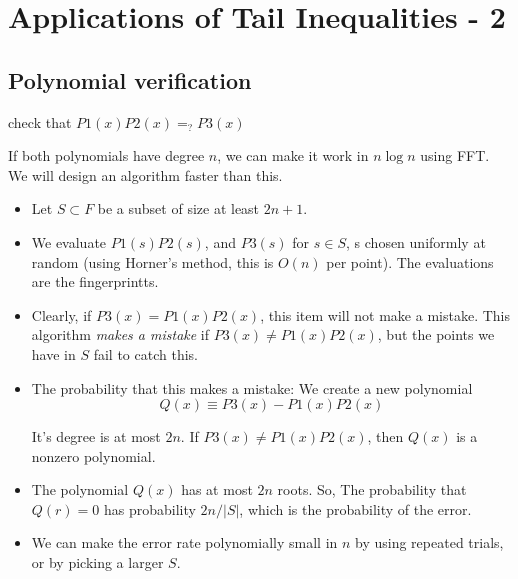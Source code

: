 \chapter{Applications of Tail Inequalities - 2}


\section{Polynomial verification}
check that $P1(x) P2(x) =_? P3(x)$

If both polynomials have degree $n$, we can make it work in $n \log n$ using
FFT. We will design an algorithm faster than this.


\begin{itemize}
    \item Let $S \subset F$ be a subset of size at least $2n + 1$.
    \item We evaluate $P1(s) P2(s)$, and $P3(s)$ for $s \in S$, s chosen uniformly
    at random (using Horner's method, this is $O(n)$ per point). The evaluations
    are the fingerprintts.
    
    \item Clearly, if $P3(x) = P1(x) P2(x)$, this item will not make a
    mistake. This algorithm \textit{makes a mistake} if $P3(x) \neq P1(x) P2(x)$, but the
    points we have in $S$ fail to catch this.
    \item The probability that this makes a mistake: We create a new polynomial
    $$Q(x) \equiv P3(x) - P1(x) P2(x)$$
    
    It's degree is at most $2n$. If $P3(x) \neq P1(x) P2(x)$, then $Q(x)$ is a
    nonzero polynomial.

    \item The polynomial $Q(x)$ has at most $2n$ roots. So, The probability
    that $Q(r) = 0$ has probability $2n/|S|$, which is the probability of the
    error.

    \item We can make the error rate polynomially small in $n$ by using
    repeated trials, or by picking a larger $S$.
\end{itemize}

